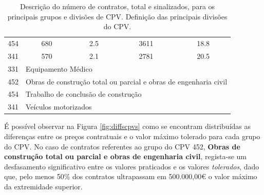 \begin{table}[H]
{\begin{tabular}{ccccc}
		454                  & 680                                                                                         & 2.5                                & 3611                                                                                  & 18.8                           \\
		341                  & 570                                                                                         & 2.1                                & 2781                                                                                  & 20.5                           \\ \hline
		331                  & \multicolumn{4}{l}{Equipamento Médico}                                                                                                                                                                                                                    \\
		452                  & \multicolumn{4}{l}{Obras de construção total ou parcial e obras de engenharia civil}                                                                                                                                                                      \\
		454                  & \multicolumn{4}{l}{Trabalho de conclusão de construção}                                                                                                                                                                                                   \\
		341                  & \multicolumn{4}{l}{Veículos motorizados}                                                                                                                                                                                                                  \\ \hline
	\end{tabular}%
	}
	\caption{Descrição do número de contratos, total e sinalizados, para os principais grupos e divisões de CPV. Definição das principais divisões do CPV.}
	\label{tab:rf17stats}
\end{table}


É possível observar na Figura \ref{fig:diffscpvs} como se encontram distribuídas as diferenças entre os preços contratuais e o valor máximo tolerado para cada grupo do CPV. No caso de contratos referentes ao grupo do CPV 452, \textbf{Obras de construção total ou parcial e obras de engenharia civil}, regista-se um desfasamento significativo entre os valores praticados e os valores \textit{tolerados}, dado que, pelo menos 50\% dos contratos ultrapassam em 500.000,00€ o valor máximo da extremidade superior.

